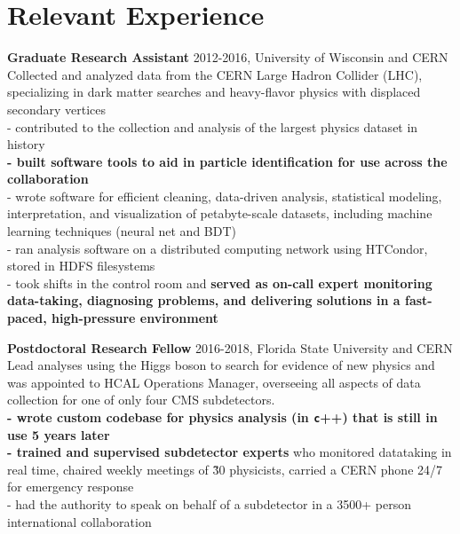 \documentclass[letterpaper,12pt]{article} %
\begin{document}
\section{Relevant Experience}
 {\large {\bf Graduate Research Assistant} 2012-2016, University of Wisconsin and CERN} \\
  Collected and analyzed data from the CERN Large Hadron Collider (LHC), specializing in dark matter searches and heavy-flavor physics with displaced secondary vertices  \\ %
 - contributed to the collection and analysis of the largest physics dataset in history \\
 {\bf - built software tools to aid in particle identification for use across the collaboration} \\
 - wrote software for efficient cleaning, data-driven analysis, statistical modeling, interpretation, and visualization of petabyte-scale datasets, including machine learning techniques (neural net and BDT) \\
 - ran analysis software on a distributed computing network using HTCondor, stored in HDFS filesystems \\
 - took shifts in the control room and {\bf served as on-call expert monitoring data-taking, diagnosing problems, and delivering solutions in a fast-paced, high-pressure environment}

 {\large {\bf Postdoctoral Research Fellow} 2016-2018, Florida State University and CERN}  \\
 Lead analyses using the Higgs boson to search for evidence of new physics and was appointed to HCAL Operations Manager, overseeing all aspects of data collection for one of only four CMS subdetectors. \\ %
{\bf - wrote custom codebase for physics analysis (in {\texttt c++}) that is still in use 5 years later} \\
{\bf - trained and supervised subdetector experts} who monitored datataking in real time, chaired weekly meetings of \~30 physicists, carried a CERN phone 24/7 for emergency response \\
- had the authority to speak on behalf of a subdetector in a 3500+ person international collaboration
\end{document}
